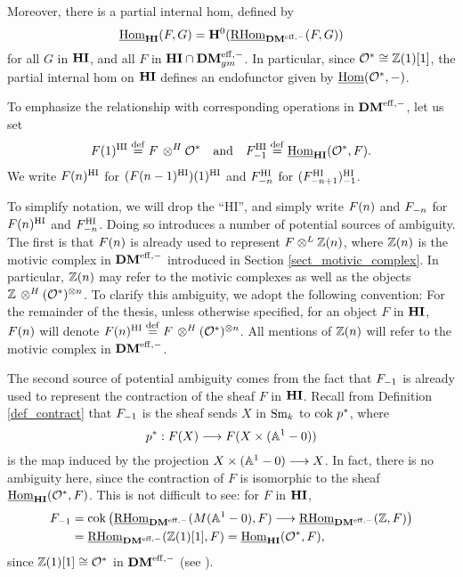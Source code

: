 Moreover, there is a partial internal hom, defined by
\[
\ihomHI(F, G) = \HH^0(\ihomDMf(F, G))
\]
for all $G$ in $\HI$, and all $F$ in $\HI \cap \DMeffgm$. In
particular, since $\Ox \cong \Z(1)[1]$, the partial internal hom on
$\HI$ defines an endofunctor given by $\ihom(\Ox, -)$. 

\begin{defn}
  To emphasize the relationship with corresponding operations in
  $\DMeff$, let us set
\[
\LHIs{F} \defeq F \tHI \Ox \hspace{10pt} \textrm{and}\hspace{10pt} 
   \RHIs{F} \defeq \ihomHI(\Ox, F).
\]
We write $\LHIs[n]{F}$ for $\LHIs{(\LHIs[n - 1]{F})}$ and 
$\RHIs[n]{F}$ for $\RHIs{(\RHIs[n + 1]{F})}$.
\end{defn}

\begin{rmk}\label{rmk_contraction}
To simplify notation, we will drop the ``HI'', and simply write 
$\LHI[n]{F}$ and $\RHI[n]{F}$ for $\LHIs[n]{F}$ and $\RHIs[n]{F}$.
Doing so introduces a number of potential sources of ambiguity. 
The first is that $\LHI[n]{F}$ is already used to represent $F 
\tDM \Z(n)$, where $\Z(n)$ is the motivic complex in $\DMeff$ 
introduced in Section \ref{sect_motivic_complex}. In particular, 
$\LHI[n]{\Z}$ may refer to the motivic complexes as well as the 
objects $\Z \tHI (\Ox)^{\tensor n}$. To clarify this ambiguity, we 
adopt the following convention: For the remainder of the thesis, 
unless otherwise specified, for an object $F$ in $\HI$, 
$\LHI[n]{F}$ will denote $\LHIs[n]{F} \defeq F \tHI 
(\Ox)^{\tensor n}$. All mentions of $\Z(n)$ will refer to the 
motivic complex in $\DMeff$.

The second source of potential ambiguity comes from the fact that 
$\RHI{F}$ is already used to represent the contraction of the 
sheaf $F$ in $\HI$. Recall from Definition \ref{def_contract} that 
$\RHI{F}$ is the sheaf sends $X$ in $\Sm$ to $\cok p^*$, where 
\[
p^* : F(X) \to F(X \times (\A^1 - 0))
\]
is the map induced by the projection $X \times (\A^1 - 0) \to X$.
In fact, there is no ambiguity here, since the contraction of $F$ 
is isomorphic to the sheaf $\ihomHI(\Ox, F)$. This is not 
difficult to see: for $F$ in $\HI$,
\begin{align*}
\RHI{F} &= \mathrm{cok}\left(\ihomDMf(M(\A^1 - 0), F) \to \ihomDMf(\Z, F)\right) \\
&= \ihomDMf(\Z(1)[1], F) = \ihomHI(\Ox, F),
\end{align*}
since $\Z(1)[1] \cong \Ox$ in $\DMeff$ (see \cite[4.1]{MVW}).
\end{rmk}

